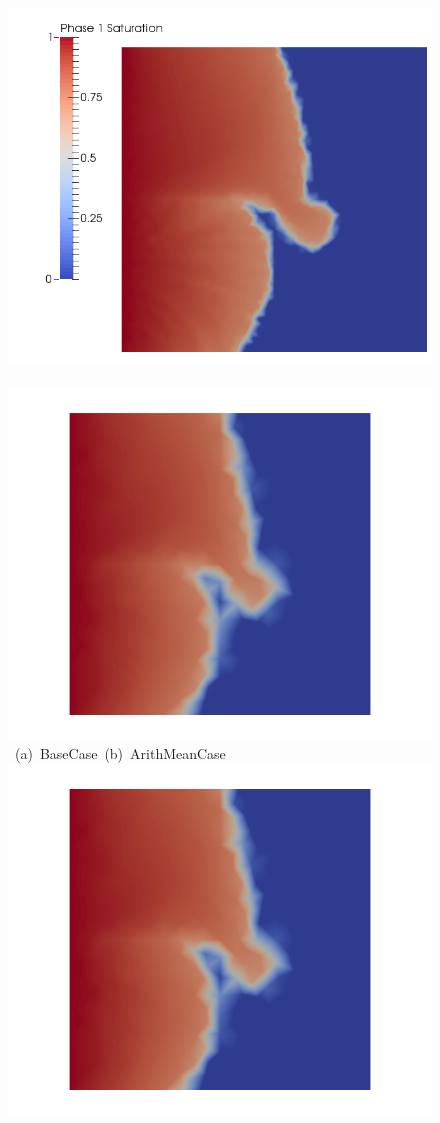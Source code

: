 \begin{landscape}
\begin{figure}[ht] 
\vbox{\vspace{-1cm}
\hspace{0.0cm} \hbox{\hspace{4cm} \includegraphics[width=.56\textwidth]{./Pics/BaseCase/BaseCase_Saturation_t_1dot15withlegend.png}
      \hspace {1.5cm} \includegraphics[width=.56\textwidth]{./Pics/ArithMeanCase/ArithMeanCase_Saturation_t_1dot15.png}}
\vspace{0.cm}
\hbox{\hspace{7.0cm} (a) BaseCase \hspace{5.75cm} (b) ArithMeanCase}
\vspace{0.5cm}
\hbox{
      \includegraphics[width=.56\textwidth]{./Pics/HarmMeanCase/HarmMeanCase_Saturation_t_1dot15.png}
}}
\end{figure}
\end{landscape}
